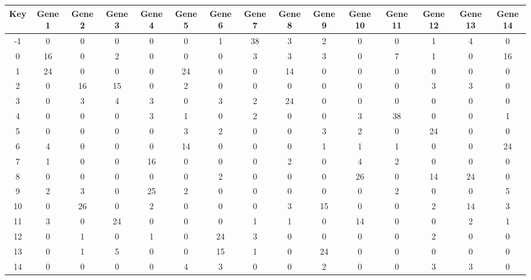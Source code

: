 \begin{tabular}{|c|c|c|c|c|c|c|c|c|c|c|c|c|c|c|}
\hline
Key & Gene 1 & Gene 2 & Gene 3 & Gene 4 & Gene 5 & Gene 6 & Gene 7 & Gene 8 & Gene 9 & Gene 10 & Gene 11 & Gene 12 & Gene 13 & Gene 14 \\
\hline
-1 & 0 & 0 & 0 & 0 & 0 & 1 & 38 & 3 & 2 & 0 & 0 & 1 & 4 & 0 \\
0 & 16 & 0 & 2 & 0 & 0 & 0 & 3 & 3 & 3 & 0 & 7 & 1 & 0 & 16 \\
1 & 24 & 0 & 0 & 0 & 24 & 0 & 0 & 14 & 0 & 0 & 0 & 0 & 0 & 0 \\
2 & 0 & 16 & 15 & 0 & 2 & 0 & 0 & 0 & 0 & 0 & 0 & 3 & 3 & 0 \\
3 & 0 & 3 & 4 & 3 & 0 & 3 & 2 & 24 & 0 & 0 & 0 & 0 & 0 & 0 \\
4 & 0 & 0 & 0 & 3 & 1 & 0 & 2 & 0 & 0 & 3 & 38 & 0 & 0 & 1 \\
5 & 0 & 0 & 0 & 0 & 3 & 2 & 0 & 0 & 3 & 2 & 0 & 24 & 0 & 0 \\
6 & 4 & 0 & 0 & 0 & 14 & 0 & 0 & 0 & 1 & 1 & 1 & 0 & 0 & 24 \\
7 & 1 & 0 & 0 & 16 & 0 & 0 & 0 & 2 & 0 & 4 & 2 & 0 & 0 & 0 \\
8 & 0 & 0 & 0 & 0 & 0 & 2 & 0 & 0 & 0 & 26 & 0 & 14 & 24 & 0 \\
9 & 2 & 3 & 0 & 25 & 2 & 0 & 0 & 0 & 0 & 0 & 2 & 0 & 0 & 5 \\
10 & 0 & 26 & 0 & 2 & 0 & 0 & 0 & 3 & 15 & 0 & 0 & 2 & 14 & 3 \\
11 & 3 & 0 & 24 & 0 & 0 & 0 & 1 & 1 & 0 & 14 & 0 & 0 & 2 & 1 \\
12 & 0 & 1 & 0 & 1 & 0 & 24 & 3 & 0 & 0 & 0 & 0 & 2 & 0 & 0 \\
13 & 0 & 1 & 5 & 0 & 0 & 15 & 1 & 0 & 24 & 0 & 0 & 0 & 0 & 0 \\
14 & 0 & 0 & 0 & 0 & 4 & 3 & 0 & 0 & 2 & 0 & 0 & 3 & 3 & 0 \\
\hline
\end{tabular}